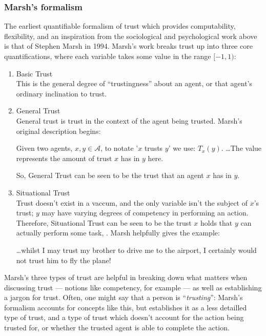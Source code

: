 \subsubsection{Marsh's formalism}
The earliest quantifiable formalism of trust which provides computability, flexibility, and an inspiration from the sociological and psychological work above is that of Stephen Marsh in 1994\cite{Marsh1994FormalisingConcept}. Marsh's work breaks trust up into three core quantifications, where each variable takes some value in the range \({[-1,1)}\):
\begin{enumerate}
    \item Basic Trust \\
    This is the general degree of ``trustingness'' about an agent, or that agent's ordinary inclination to trust.
    \item General Trust \\
    General trust is trust in the context of the agent being trusted. Marsh's original description begins\cite{Marsh1994FormalisingConcept}:
    \begin{displayquote}
        Given two agents, \(x, y \in \mathcal{A}\), to notate '\(x\) trusts \(y\)'  we use: \(T_{x}(y)\). {\ldots}The value represents the amount of trust \(x\) has in \(y\) here.
    \end{displayquote}
    So, General Trust can be seen to be the trust that an agent \(x\) has in \(y\).
    \item Situational Trust \\
    Trust doesn't exist in a vaccum, and the only variable isn't the subject of \(x\)'s trust; \(y\) may have varying degrees of competency in performing an action. Therefore, Situational Trust can be seen to be the trust \(x\) holds that \(y\) can actually perform some task, \safealpha. Marsh helpfully gives the example\cite{Marsh1994FormalisingConcept}:
    \begin{displayquote}
        {\ldots}whilst I may trust my brother to drive me to the airport, I certainly would not trust him to fly the plane!
    \end{displayquote}
\end{enumerate}\par

Marsh's three types of trust are helpful in breaking down what matters when discussing trust --- notions like competency, for example --- as well as establishing a jargon for trust. Often, one might say that a person is ``\emph{trusting}'': Marsh's formalism accounts for concepts like this, but establishes it as a less detailled type of trust, and a type of trust which doesn't account for the action being trusted for, or whether the trusted agent is able to complete the action.\par

